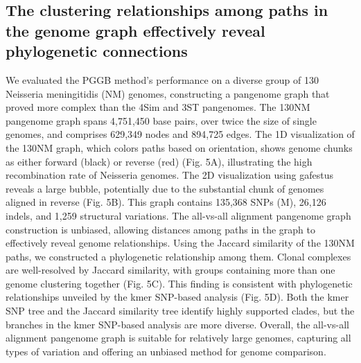 \subsection{The clustering relationships among paths in the genome graph effectively reveal phylogenetic connections}
We evaluated the PGGB method's performance on a diverse group of 130 Neisseria meningitidis (NM) genomes, constructing a pangenome graph that proved more complex than the 4Sim and 3ST pangenomes. The 130NM pangenome graph spans 4,751,450 base pairs, over twice the size of single genomes, and comprises 629,349 nodes and 894,725 edges.
The 1D visualization of the 130NM graph, which colors paths based on orientation, shows genome chunks as either forward (black) or reverse (red) (Fig. 5A), illustrating the high recombination rate of Neisseria genomes. The 2D visualization using gafestus reveals a large bubble, potentially due to the substantial chunk of genomes aligned in reverse (Fig. 5B). This graph contains 135,368 SNPs (M), 26,126 indels, and 1,259 structural variations.
The all-vs-all alignment pangenome graph construction is unbiased, allowing distances among paths in the graph to effectively reveal genome relationships. Using the Jaccard similarity of the 130NM paths, we constructed a phylogenetic relationship among them. Clonal complexes are well-resolved by Jaccard similarity, with groups containing more than one genome clustering together (Fig. 5C). This finding is consistent with phylogenetic relationships unveiled by the kmer SNP-based analysis (Fig. 5D). Both the kmer SNP tree and the Jaccard similarity tree identify highly supported clades, but the branches in the kmer SNP-based analysis are more diverse. Overall, the all-vs-all alignment pangenome graph is suitable for relatively large genomes, capturing all types of variation and offering an unbiased method for genome comparison.
